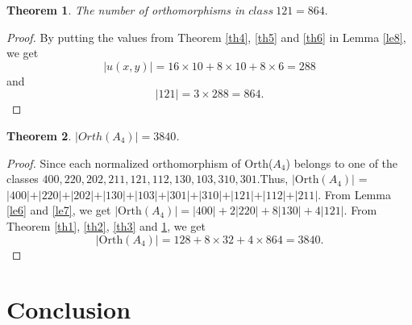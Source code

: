 \documentclass[11pt,a4paper]{article}
\newtheorem{theorem}{Theorem}[section]
\theoremstyle{definition}
\theoremstyle{remark}
\begin{document}
\begin{theorem}\label{th7}
	The number of orthomorphisms in $class~121  = 864.$
\end{theorem}
\begin{proof}
 By putting the values from Theorem \ref{th4}, \ref{th5} and \ref{th6} in Lemma \ref{le8}, we get  $$\vert u(x,y) \vert = 16 \times 10 + 8 \times 10 + 8 \times 6 = 288$$ and $$\vert 121 \vert = 3 \times 288 = 864.$$
\end{proof}

 \begin{theorem}\label{th8}
 	$\vert Orth(A_{4}) \vert = 3840$.
 \end{theorem}
 \begin{proof}
 	Since  each normalized orthomorphism of Orth($A_{4}$) belongs to one of the classes $400,220,202,211,121,112,130,103,310,301$.Thus, $\vert \text{Orth}(A_{4}) \vert$ = $\vert 400 \vert + \vert 220 \vert+\vert 202 \vert+\vert 130 \vert+\vert 103 \vert+\vert 301 \vert+\vert 310 \vert+\vert 121 \vert+\vert 112 \vert+\vert 211 \vert$. From Lemma \ref{le6} and \ref{le7}, we get $\vert \text{Orth}(A_{4}) \vert = \vert 400 \vert + 2 \vert 220 \vert + 8 \vert 130 \vert + 4 \vert 121 \vert $. From Theorem \ref{th1}, \ref{th2}, \ref{th3} and \ref{th7}, we get $$\vert \text{Orth}(A_{4}) \vert = 128 + 8 \times 32 + 4 \times 864 = 3840.$$
 \end{proof}
	\section{Conclusion}
	
\end{document}
